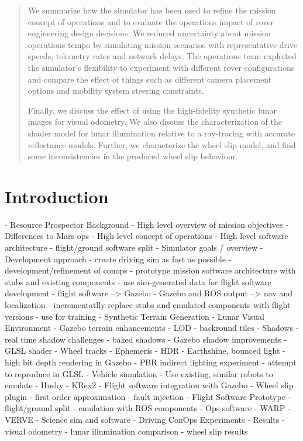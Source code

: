 \documentclass[twocolumn,letterpaper]{IEEEAerospaceCLS}  %
\begin{document}
\begin{abstract}
We summarize how the simulator has been used to refine the mission concept of operations and to evaluate the operations impact of rover engineering design decisions. We reduced uncertainty about mission operations tempo by simulating mission scenarios with representative drive speeds, telemetry rates and network delays. The operations team exploited the simulator’s flexibility to experiment with different rover configurations and compare the effect of things such as different camera placement options and mobility system steering constraints.

Finally, we discuss the effect of using the high-fidelity synthetic lunar images for visual odometry.  We also discuss the characterization of the shader model for lunar illumination relative to a ray-tracing with accurate reflectance models.  Further, we characterize the wheel slip model, and find some inconsistencies in the produced wheel slip behaviour.

\end{abstract}


\tableofcontents

\section{Introduction}


- Resource Prospector Background
  - High level overview of mission objectives
  - Differences to Mars ops
  - High level concept of operations
  - High level software architecture
    - flight/ground software split
- Simulator goals / overview
  - Development approach
    - create driving sim as fast as possible
      - development/refinement of conops
    - prototype mission software architecture with stubs and existing components
    - use sim-generated data for flight software development
      - flight software --> Gazebo
      - Gazebo and ROS output --> nav and localization
    - incrementatlly replace stubs and emulated components with flight versions
    - use for training
- Synthetic Terrain Generation
- Lunar Visual Environment
  - Gazebo terrain enhancements
    - LOD
    - backround tiles
  - Shadows
    - real time shadow challenges 
    - baked shadows
    - Gazebo shadow improvements
  - GLSL shader
  - Wheel tracks
  - Ephemeris
  - HDR
    - Earthshine, bounced light
    - high bit depth rendering in Gazebo
    - PBR indirect lighting experiment 
    - attempt to reproduce in GLSL 
- Vehicle simulation
  - Use existing, similar robots to emulate 
    - Husky
    - KRex2
  - Flight software integration with Gazebo
  - Wheel slip plugin
    - first order approximation
    - fault injection
- Flight Software Prototype
  - flight/ground split
  - emulation with ROS components
  - Ops software
    - WARP
    - VERVE
  - Science sim and software
- Driving ConOps Experiments
- Results
  - visual odometry
  - lunar illumination comparison 
  - wheel slip results
  
\end{document}
